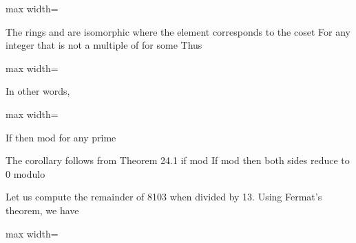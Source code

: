 \documentclass[11pt,oneside]{article}
\begin{document}
\begin{BookBody}

\begin{center}\begin{adjustbox}{max width=\linewidth}\end{adjustbox}\end{center}

The rings  and  are isomorphic where the element  corresponds to the coset  For any integer  that is not a multiple of  for some  Thus

\begin{center}\begin{adjustbox}{max width=\linewidth}\end{adjustbox}\end{center}

\noindent In other words,

\begin{center}\begin{adjustbox}{max width=\linewidth}\end{adjustbox}\end{center} \BookEnd{\blacklozenge}

 If  then mod  for any prime 

 The corollary follows from Theorem 24.1 if mod  If mod  then both sides reduce to 0 modulo \BookEnd{\blacklozenge}

 Let us compute the remainder of 8103 when divided by 13. Using Fermat’s theorem, we have

\begin{center}\begin{adjustbox}{max width=\linewidth}\end{adjustbox}\end{center} \BookEnd{\blacktriangle}


\end{BookBody}
\end{document}
